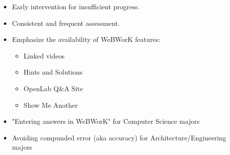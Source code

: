 \documentclass{ximera}
\begin{document}
\begin{itemize}
 \item Early intervention for insufficient progress.
 \item Consistent and frequent assessment.
 \item Emphasize the availability of WeBWorK features:
 \begin{itemize}
  \item Linked videos
  \item Hints and Solutions
  \item OpenLab Q\&A Site
  \item Show Me Another
 \end{itemize}
 \item "Entering answers in WeBWorK" for Computer Science majors
 \item Avoiding compunded error (aka accuracy) for Architecture/Engineering majors
\end{itemize}
\end{document}
